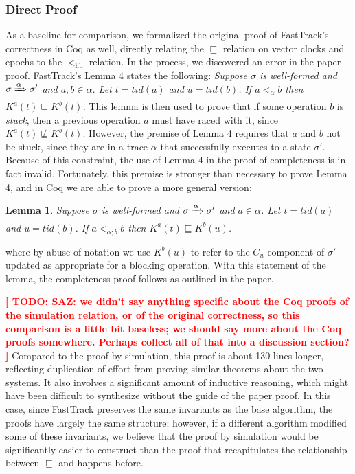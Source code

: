 \documentclass[preprint, 10pt]{sigplanconf}
\newcommand{\TODO}[1]{\textbf{\textcolor{red}{[ TODO: #1]}}}
\newcommand{\hb}[0]{<_{\mathrm{hb}}}
\newtheorem{lemma}{Lemma}
\begin{document}
\subsubsection{Direct Proof}
\label{bug}
As a baseline for comparison, we formalized the original proof of FastTrack's correctness in Coq as well, directly relating the $\sqsubseteq$ relation on vector clocks and epochs to the $\hb$ relation. In the process, we discovered an error in the paper proof. FastTrack's Lemma 4 states the following: {\it Suppose $\sigma$ is well-formed and $\sigma \xRightarrow{\alpha} \sigma'$ and $a, b \in \alpha$. Let $t = \mathit{tid}(a)$ and $u = \mathit{tid}(b)$. If $a <_{\alpha} b$ then $K^a(t) \sqsubseteq K^b(t)$.} This lemma is then used to prove that if some operation $b$ is \emph{stuck}, then a previous operation $a$ must have raced with it, since $K^a(t) \not\sqsubseteq K^b(t)$. However, the premise of Lemma 4 requires that $a$ and $b$ not be stuck, since they are in a trace $\alpha$ that successfully executes to a state $\sigma'$. Because of this constraint, the use of Lemma 4 in the proof of completeness is in fact invalid. Fortunately, this premise is stronger than necessary to prove Lemma 4, and in Coq we are able to prove a more general version:
\begin{lemma}Suppose $\sigma$ is well-formed and $\sigma \xRightarrow{\alpha} \sigma'$ and $a \in \alpha$. Let $t = \mathit{tid}(a)$ and $u = \mathit{tid}(b)$. If $a <_{\alpha; b} b$ then $K^a(t) \sqsubseteq K^b(u)$.\end{lemma}
\noindent where by abuse of notation we use $K^b(u)$ to refer to the $C_u$ component of $\sigma'$ updated as appropriate for a blocking operation. With this statement of the lemma, the completeness proof follows as outlined in the paper.

\TODO{SAZ: we didn't say anything specific about the Coq proofs of the simulation relation, or of the original correctness, so this comparison is a little bit baseless; we should say more about the Coq proofs somewhere. Perhaps collect all of that into a discussion section? }
Compared to the proof by simulation, this proof is about 130 lines longer, reflecting duplication of effort from proving similar theorems about the two systems. It also involves a significant amount of inductive reasoning, which might have been difficult to synthesize without the guide of the paper proof. In this case, since FastTrack preserves the same invariants as the base algorithm, the proofs have largely the same structure; however, if a different algorithm modified some of these invariants, we believe that the proof by simulation would be significantly easier to construct than the proof that recapitulates the relationship between $\sqsubseteq$ and happens-before.
\end{document}
